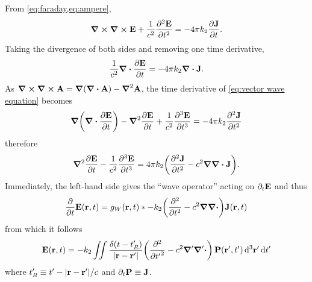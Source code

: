 From \cref{eq:faraday,eq:ampere},
\begin{equation}
  \curl{\curl{\vb{E}}} + \frac{1}{c^2} \pdv[2]{\vb{E}}{t} = -4\pi k_2 \pdv{\vb{J}}{t}.
  \label{eq:vector wave equation}
\end{equation}
Taking the divergence of both sides and removing one time derivative,
\begin{equation*}
  \frac{1}{c^2} \div{\pdv{\vb{E}}{t}} = -4 \pi k_2 \div{\vb{J}}.
\end{equation*}
As $\curl{\curl{\vb{A}}} = \grad{\qty(\div{\vb{A}})} - \grad^2{\vb{A}}$, the time derivative of \cref{eq:vector wave equation} becomes
\begin{equation*}
  \grad{\qty(\div{\pdv{\vb{E}}{t}})} - \grad^2 \pdv{\vb{E}}{t} + \frac{1}{c^2} \pdv[3]{\vb{E}}{t} = -4\pi k_2 \pdv[2]{\vb{J}}{t}
\end{equation*}
therefore
\begin{equation*}
  \grad^2 \pdv{\vb{E}}{t} - \frac{1}{c^2} \pdv[3]{\vb{E}}{t} = 4\pi k_2 \qty(\pdv[2]{\vb{J}}{t} - c^2 \grad \div{\vb{J}}).
\end{equation*}
Immediately, the left-hand side gives the ``wave operator'' acting on $\partial_t \vb{E}$ and thus
\begin{equation*}
  \pdv{t} \vb{E}(\vb{r}, t) = g_W(\vb{r}, t) \ast -k_2\qty(\pdv[2]{t} - c^2 \grad \div) \vb{J}(\vb{r}, t)
\end{equation*}
from which it follows
\begin{equation}
  \vb{E}(\vb{r}, t) = -k_2 \iint \frac{\delta\qty(t - t'_R )}{\abs{\vb{r} - \vb{r}'}} \qty(\pdv[2]{{t'}} - c^2 \grad' \grad'\boldsymbol{\cdot}) \, \vb{P}(\vb{r}', t') \dd[3]{\vb{r}'} \dd{t'}
\end{equation}
where $t'_R \equiv t' - \abs{\vb{r} - \vb{r}'}/c$ and $\partial_t \vb{P} \equiv \vb{J}$.

